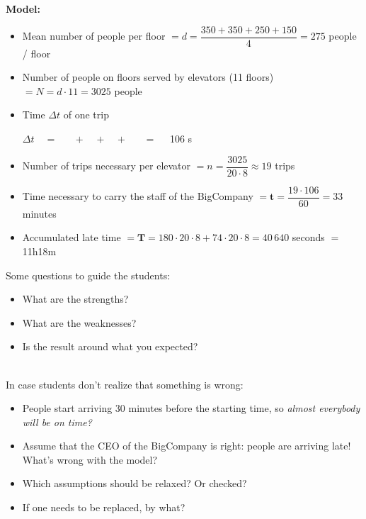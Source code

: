 \textbf{Model:}
\begin{itemize}
	\item Mean number of people per floor $= d = \dfrac{350+350+250+150}{4} = 275$ people / floor
	\item Number of people on floors served by elevators (11 floors) $= N = d \cdot 11 = 3025$ people
	\item Time $\Delta t$ of one trip

\hfil $\Delta t \quad = \quad $  
		$ \;+ \;$ 
		$ \;+\; $ 
		$\;+\; $  $\quad = \quad$ 106 s
		
		\item Number of trips necessary per elevator $= n = \dfrac{3025}{20 \cdot 8} \approx 19$ trips

		\item Time necessary to carry the staff of the BigCompany $= \pmb{t} = \dfrac{19 \cdot 106}{60} = 33 $ minutes
		
		\item Accumulated late time $ = \pmb{T} = 180 \cdot 20 \cdot 8 + 74 \cdot 20 \cdot 8 = 40\,640$ seconds $= $ 11h18m

\end{itemize}

\hfill

\begin{annotation}
	\begin{notes}

Some questions to guide the students:
	\begin{itemize}
	\item What are the strengths?
	\item What are the weaknesses?
	\item Is the result around what you expected?
\end{itemize}	
	
\hfill \\
In case students don't realize that something is wrong:
\begin{itemize}
	\item People start arriving 30 minutes before the starting time, so \emph{almost everybody will be on time?}
	\item Assume that the CEO of the BigCompany is right: people are arriving late! What's wrong with the model?

	\item Which assumptions should be relaxed? Or checked?
	\item If one needs to be replaced, by what?
	\end{itemize}
	
	\end{notes}
\end{annotation}

